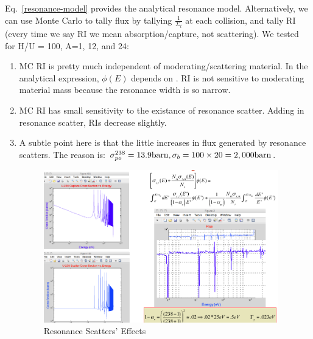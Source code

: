\documentclass{school-22.211-notes}
\begin{document}
\clearpage
{}
Eq.~\ref{resonance-model} provides the analytical resonance model. Alternatively, we can use Monte Carlo to tally flux by tallying $\displaystyle \frac{1}{\Sigma_t}$ at each collision, and tally RI (every time we say RI we mean absorption/capture, not scattering).  We tested for H/U = 100, A=1, 12, and 24: 
\begin{enumerate}
\item MC RI is pretty much independent of moderating/scattering material. In the analytical expression, $\phi(E)$ depends on . RI is not sensitive to moderating material mass because the resonance width is so narrow. 

\item MC RI has small sensitivity to the existance of resonance scatter. Adding in resonance scatter, RIs decrease slightly. 

\item A subtle point here is that the little increases in flux generated by resonance scatters. The reason is: 
 $\sigma_{po}^{238} = 13.9 \mathrm{barn}, \sigma_b = 100 \times 20 = 2,000 \mathrm{barn}$. 
  \begin{figure}[h]
    \centering
    \includegraphics[width=4in]{images/r-m/res-scat.png}
    \caption{Resonance Scatters' Effects}
  \end{figure}
\end{enumerate}


 




\clearpage
\end{document}
